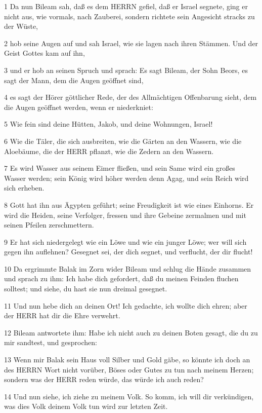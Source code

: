 \par 1 Da nun Bileam sah, daß es dem HERRN gefiel, daß er Israel segnete, ging er nicht aus, wie vormals, nach Zauberei, sondern richtete sein Angesicht stracks zu der Wüste,
\par 2 hob seine Augen auf und sah Israel, wie sie lagen nach ihren Stämmen. Und der Geist Gottes kam auf ihn,
\par 3 und er hob an seinen Spruch und sprach: Es sagt Bileam, der Sohn Beors, es sagt der Mann, dem die Augen geöffnet sind,
\par 4 es sagt der Hörer göttlicher Rede, der des Allmächtigen Offenbarung sieht, dem die Augen geöffnet werden, wenn er niederkniet:
\par 5 Wie fein sind deine Hütten, Jakob, und deine Wohnungen, Israel!
\par 6 Wie die Täler, die sich ausbreiten, wie die Gärten an den Wassern, wie die Aloebäume, die der HERR pflanzt, wie die Zedern an den Wassern.
\par 7 Es wird Wasser aus seinem Eimer fließen, und sein Same wird ein großes Wasser werden; sein König wird höher werden denn Agag, und sein Reich wird sich erheben.
\par 8 Gott hat ihn aus Ägypten geführt; seine Freudigkeit ist wie eines Einhorns. Er wird die Heiden, seine Verfolger, fressen und ihre Gebeine zermalmen und mit seinen Pfeilen zerschmettern.
\par 9 Er hat sich niedergelegt wie ein Löwe und wie ein junger Löwe; wer will sich gegen ihn auflehnen? Gesegnet sei, der dich segnet, und verflucht, der dir flucht!
\par 10 Da ergrimmte Balak im Zorn wider Bileam und schlug die Hände zusammen und sprach zu ihm: Ich habe dich gefordert, daß du meinen Feinden fluchen solltest; und siehe, du hast sie nun dreimal gesegnet.
\par 11 Und nun hebe dich an deinen Ort! Ich gedachte, ich wollte dich ehren; aber der HERR hat dir die Ehre verwehrt.
\par 12 Bileam antwortete ihm: Habe ich nicht auch zu deinen Boten gesagt, die du zu mir sandtest, und gesprochen:
\par 13 Wenn mir Balak sein Haus voll Silber und Gold gäbe, so könnte ich doch an des HERRN Wort nicht vorüber, Böses oder Gutes zu tun nach meinem Herzen; sondern was der HERR reden würde, das würde ich auch reden?
\par 14 Und nun siehe, ich ziehe zu meinem Volk. So komm, ich will dir verkündigen, was dies Volk deinem Volk tun wird zur letzten Zeit.
